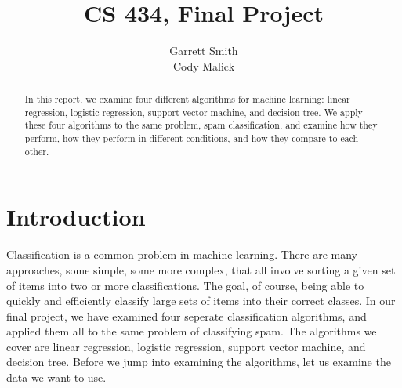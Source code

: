 \documentclass{article} %
\title{CS 434, Final Project}
\author{Garrett Smith \\
\AND
Cody Malick
}
\begin{document}
\maketitle

\begin{abstract}
  \noindent In this report, we examine four different algorithms for machine
  learning: linear regression, logistic regression, support vector machine,
  and decision tree. We apply these four algorithms to the same problem, spam
  classification, and examine how they perform, how they perform in different
  conditions, and how they compare to each other.
\end{abstract}
\clearpage
\tableofcontents
\clearpage
\section{Introduction}
Classification is a common problem in machine learning. There are many approaches,
some simple, some more complex, that all involve sorting a given set of items into
two or more classifications. The goal, of course, being able to quickly and efficiently
classify large sets of items into their correct classes. In our final project, we
have examined four seperate classification algorithms, and applied them all to the
same problem of classifying spam. The algorithms we cover are linear regression,
logistic regression, support vector machine, and decision tree. Before we jump
into examining the algorithms, let us examine the data we want to use.
\end{document}
